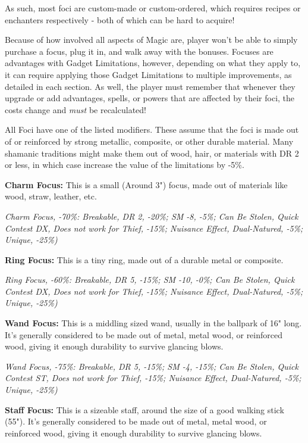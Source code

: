 \begin{multicols*}{2}
	As such, most foci are custom-made or custom-ordered, which requires recipes or enchanters respectively - both of which can be hard to acquire!
	
	Because of how involved all aspects of Magic are, player won't be able to simply purchase a focus, plug it in, and walk away with the bonuses. Focuses are advantages with Gadget Limitations, however, depending on what they apply to, it can require applying those Gadget Limitations to multiple improvements, as detailed in each section. As well, the player must remember that whenever they upgrade or add advantages, spells, or powers that are affected by their foci, the costs change and \textit{must} be recalculated!
	
	All Foci have one of the listed modifiers. These assume that the foci is made out of or reinforced by strong metallic, composite, or other durable material. Many shamanic traditions might make them out of wood, hair, or materials with DR 2 or less, in which case increase the value of the limitations by -5\%.
	
	\textbf{Charm Focus:} This is a small (Around 3") focus, made out of materials like wood, straw, leather, etc.
	
	\textcolor{OliveGreen}{\textit{Charm Focus, -70\%: Breakable, DR 2, -20\%; SM -8, -5\%; Can Be Stolen, Quick Contest DX, Does not work for Thief, -15\%; Nuisance Effect, Dual-Natured, -5\%; Unique, -25\%)}}
	
	\textbf{Ring Focus:} This is a tiny ring, made out of a durable metal or composite.
	
	\textcolor{OliveGreen}{\textit{Ring Focus, -60\%: Breakable, DR 5, -15\%; SM -10, -0\%; Can Be Stolen, Quick Contest DX, Does not work for Thief, -15\%; Nuisance Effect, Dual-Natured, -5\%; Unique, -25\%)}}
	
	\textbf{Wand Focus:} This is a middling sized wand, usually in the ballpark of 16" long. It's generally considered to be made out of metal, metal wood, or reinforced wood, giving it enough durability to survive glancing blows.
	
	\textcolor{OliveGreen}{\textit{Wand Focus, -75\%: Breakable, DR 5, -15\%; SM -4, -15\%; Can Be Stolen, Quick Contest ST, Does not work for Thief, -15\%; Nuisance Effect, Dual-Natured, -5\%; Unique, -25\%)}}
	
	\textbf{Staff Focus:} This is a sizeable staff, around the size of a good walking stick (55"). It's generally considered to be made out of metal, metal wood, or reinforced wood, giving it enough durability to survive glancing blows.
	

\end{multicols*}
